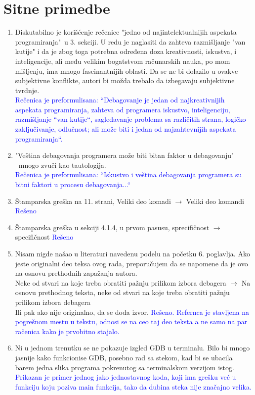 \documentclass[a4paper]{report}
\newcommand{\odgovor}[1]{\textcolor{blue}{#1}}
\begin{document}
\section{Sitne primedbe}
\begin{enumerate}
		
	\item Diskutabilno je korišćenje rečenice "jedno od najintelektualnijih aspekata programiranja"\ u 3. sekciji. U redu je naglasiti da zahteva razmišljanje "van kutije" i da je zbog toga potrebna određena doza kreativnosti, iskustva, i inteligencije, ali među velikim bogatstvom računarskih nauka, po mom mišljenju, ima mnogo fascinantnijih oblasti. Da se ne bi dolazilo u ovakve subjektivne konflikte, autori bi možda trebalo da izbegavaju subjektivne tvrdnje. \\
	\odgovor{Rečenica je preformulisana: ``Debagovanje je jedan od najkreativnijih aspekata programiranja, zahteva od programera iskustvo,
inteligenciju, razmišljanje ``van kutije``, sagledavanje problema sa različitih strana, logičko zaključivanje, odlučnost;  
ali može biti i jedan od najzahtevnijih aspekata programiranja``.}
	\item "Veština debagovanja programera može biti bitan faktor u debagovanju" \ mnogo zvuči kao tautologija. \\
	\odgovor{Rečenica je preformulisana: ``Iskustvo i veština debagovanja programera su bitni faktori u procesu debagovanja...``}
	\item Štamparska greška na 11. strani, Veliki deo komadi $\rightarrow$ Veliki deo komandi
	\odgovor{Rešeno}
	\item Štamparska greška u sekciji 4.1.4, u prvom pasusu,  sprecifičnost $\rightarrow$ specifičnost
	\odgovor{Rešeno}
	\item Nisam nigde našao u literaturi navedenu podelu na početku 6. poglavlja. Ako jeste originalni deo teksa ovog rada, preporučujem da se napomene da je ovo na osnovu prethodnih zapažanja autora.
\\
 Neke od stvari na koje treba obratiti pažnju prilikom izbora debagera  $\rightarrow$  Na osnovu prethodnog teksta, neke od stvari na koje treba obratiti pažnju prilikom izbora debagera
\\
Ili pak ako nije originalno, da se doda izvor. 
\odgovor{Rešeno. Refernca je stavljena na pogrešnom mestu u tekstu, odnosi se na ceo taj deo teksta a ne samo na par račenica kako je prvobitno stajalo.}
\item Ni u jednom trenutku se ne pokazuje izgled GDB u terminalu. Bilo bi mnogo jasnije kako funkcionise GDB, posebno rad sa stekom, kad bi se ubacila barem 
jedna slika programa pokrenutog sa terminalskom verzijom istog.\\
 	\odgovor{Prikazan je primer jednog jako jednostavnog koda, koji ima grešku već u funkciju koju poziva main funkcija, tako da
 	dubina steka nije značajno velika.}
\end{enumerate}
\end{document}
